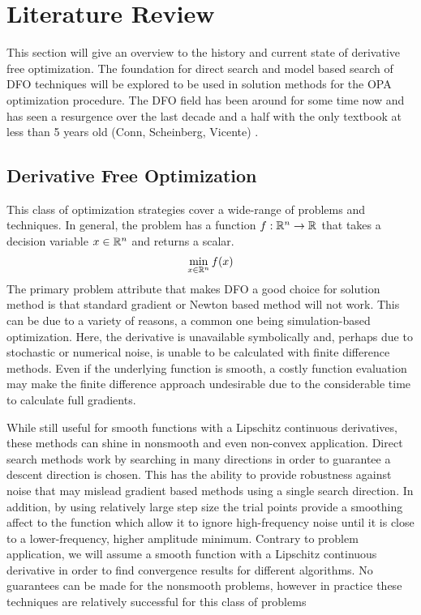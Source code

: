 \section{Literature Review}
This section will give an overview to the history and current state of derivative free optimization.  The foundation for direct search and model based search of DFO techniques will be explored to be used in solution methods for the OPA optimization procedure.  The DFO field has been around for some time now and has seen a resurgence over the last decade and a half with the only textbook at less than 5 years old (Conn, Scheinberg, Vicente) \cite{conn_2009}.
\subsection{Derivative Free Optimization}
This class of optimization strategies cover a wide-range of problems and techniques.  In general, the problem has a function $f: \mathbb{R}^{n} \rightarrow \mathbb{R}^{}$ that takes a decision variable $x \in \mathbb{R}^{n}$ and returns a scalar. 
\begin{equation}
\min_{x \in \mathbb{R}^{n}} f(x)
\end{equation}
The primary problem attribute that makes DFO a good choice for solution method is that standard gradient or Newton based method will not work.  This can be due to a variety of reasons, a common one being simulation-based optimization.  Here, the derivative is unavailable symbolically and, perhaps due to stochastic or numerical noise, is unable to be calculated with finite difference methods.  Even if the underlying function is smooth, a costly function evaluation may make the finite difference approach undesirable due to the considerable time to calculate full gradients.

While still useful for smooth functions with a Lipschitz continuous derivatives, these methods can shine in nonsmooth and even non-convex application.  Direct search methods work by searching in many directions in order to guarantee a descent direction is chosen.  This has the ability to provide robustness against noise that may mislead gradient based methods using a single search direction.  In addition, by using relatively large step size the trial points provide a smoothing affect to the function which allow it to ignore high-frequency noise until it is close to a lower-frequency, higher amplitude minimum.  Contrary to problem application, we will assume a smooth function with a Lipschitz continuous derivative in order to find convergence results for different algorithms.  No guarantees can be made for the nonsmooth problems, however in practice these techniques are relatively successful for this class of problems

